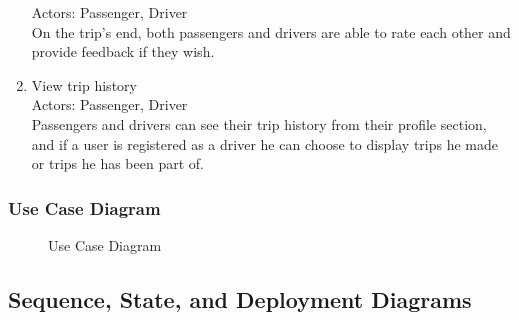 \documentclass[a4paper, 12pt]{article} %
\begin{document}
\begin{enumerate}
                    Actors: Passenger, Driver\\
                    On the trip's end, both passengers and drivers are able to rate each other and provide feedback if they wish.
                \item View trip history \\
                    Actors: Passenger, Driver \\
                    Passengers and drivers can see their trip history from their profile section, and if a user is registered as a driver he can choose to display trips he made or trips he has been part of.
            \end{enumerate}
        
        \pagebreak
        \subsubsection{Use Case Diagram}

            \begin{figure}[h]
                \centering
                \caption{Use Case Diagram}
                \label{fig:usecase}
            \end{figure}

    \pagebreak
    \subsection{Sequence, State, and Deployment Diagrams}
\end{document}
